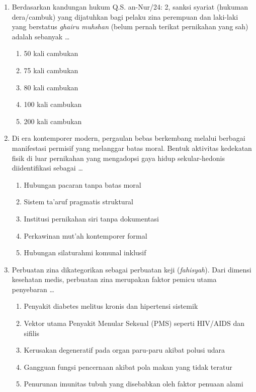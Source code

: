 \documentclass[12pt,a4paper]{article}
\begin{document}
\begin{enumerate}[leftmargin=*]

\item Berdasarkan kandungan hukum Q.S. an-Nur/24: 2, sanksi syariat (hukuman dera/cambuk) yang dijatuhkan bagi pelaku zina perempuan dan laki-laki yang berstatus \textit{ghairu muhshan} (belum pernah terikat pernikahan yang sah) adalah sebanyak \dots
    \begin{enumerate}[label=\alph*.]
        \item 50 kali cambukan
        \item 75 kali cambukan
        \item 80 kali cambukan
        \item 100 kali cambukan
        \item 200 kali cambukan
    \end{enumerate}

\item Di era kontemporer modern, pergaulan bebas berkembang melalui berbagai manifestasi permisif yang melanggar batas moral. Bentuk aktivitas kedekatan fisik di luar pernikahan yang mengadopsi gaya hidup sekular-hedonis diidentifikasi sebagai \dots
    \begin{enumerate}[label=\alph*.]
        \item Hubungan pacaran tanpa batas moral
        \item Sistem ta'aruf pragmatis struktural
        \item Institusi pernikahan siri tanpa dokumentasi
        \item Perkawinan mut'ah kontemporer formal
        \item Hubungan silaturahmi komunal inklusif
    \end{enumerate}

\item Perbuatan zina dikategorikan sebagai perbuatan keji (\textit{fahisyah}). Dari dimensi kesehatan medis, perbuatan zina merupakan faktor pemicu utama penyebaran \dots
    \begin{enumerate}[label=\alph*.]
        \item Penyakit diabetes melitus kronis dan hipertensi sistemik
        \item Vektor utama Penyakit Menular Seksual (PMS) seperti HIV/AIDS dan sifilis
        \item Kerusakan degeneratif pada organ paru-paru akibat polusi udara
        \item Gangguan fungsi pencernaan akibat pola makan yang tidak teratur
        \item Penurunan imunitas tubuh yang disebabkan oleh faktor penuaan alami
    \end{enumerate}


\end{enumerate}
\end{document}
